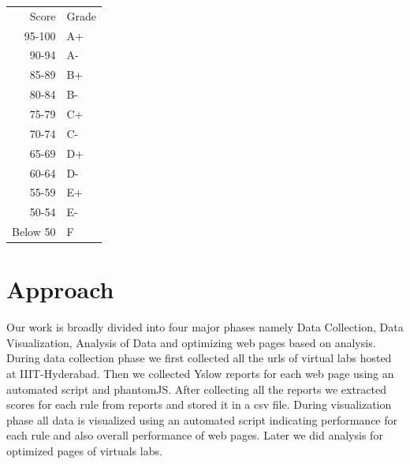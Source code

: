 \documentclass[conference]{IEEEtran}
\begin{document}
% 
% 
% 
% 
% 
\begin{center}
\begin{tabular}{rl}
    Score  &  Grade  \\
   95-100  &  A+     \\
    90-94  &  A-     \\
    85-89  &  B+     \\
    80-84  &  B-     \\
    75-79  &  C+     \\
    70-74  &  C-     \\
    65-69  &  D+     \\
    60-64  &  D-     \\
    55-59  &  E+     \\
    50-54  &  E-     \\
 Below 50  &  F      \\
\end{tabular}
\end{center}

\section{Approach}\label{sec-4}
Our work is broadly divided into four major phases namely Data Collection, Data
Visualization, Analysis of Data and optimizing web pages based on analysis.
During data collection phase we first collected all the urls of virtual labs
hosted at IIIT-Hyderabad. Then we collected Yslow reports for each web page
using an automated script and phantomJS. After collecting all the reports we
extracted scores for each rule from reports and stored it in a csv file. During
visualization phase all data is visualized using an automated script indicating
performance for each rule and also overall performance of web pages. Later we
did analysis for optimized pages of virtuals labs.
\end{document}

